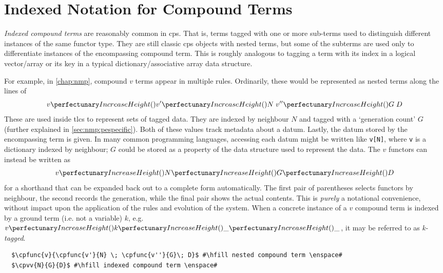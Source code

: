 \section{\label{sec:cps:compoundterms}Indexed Notation for Compound Terms}

\emph{Indexed compound terms} are reasonably common in \gls{cps}.  That is, terms tagged with one or more sub-terms used to distinguish different instances of the same \gls{functor} type.  They are still classic \gls{cps} objects with nested terms, but some of the subterms are used only to differentiate instances of the encompassing compound term.  This is roughly analogous to tagging a term with its index in a logical vector/array or its key in a typical dictionary/associative array data structure.

For example, in \cref{chap:nmp}, compound \(v\) terms appear in multiple rules.  Ordinarily, these would be represented as nested terms along the lines of
\[ \cpfunc{v}{\cpfunc{v'}{N} \; \cpfunc{v''}{G}\; D} \]
These are used inside \glspl{tlc} to represent sets of tagged data.  They are indexed by neighbour \(N\) and tagged with a `generation count' \(G\) (further explained in \cref{sec:nmp:pespecific}).  Both of these values track metadata about a datum.  Lastly, the datum stored by the encompassing term is given.  In many common programming languages, accessing each datum might be written like \texttt{v[N]}, where \texttt{v} is a dictionary indexed by neighbour;  \(G\) could be stored as a property of the data structure used to represent the data.  The \(v\) \glspl{functor} can instead be written as \[ \cpvv{N}{G}{D} \] for a shorthand that can be expanded back out to a complete form automatically.  The first pair of parentheses selects \glspl{functor} by neighbour, the second records the generation, while the final pair shows the actual contents.  This is \emph{purely} a notational convenience, without impact upon the application of the rules and evolution of the system.  When a concrete instance of a \(v\) compound term is indexed by a ground term (i.e. not a variable) \(k\), e.g. \(\cpvv{k}{\_}{\_}\), it may be referred to as \emph{k-tagged}.

\lstset{xleftmargin=.5in, xrightmargin=.5in} 
\begin{lstlisting}
  $\cpfunc{v}{\cpfunc{v'}{N} \; \cpfunc{v''}{G}\; D}$ #\hfill nested compound term \enspace#
  $\cpvv{N}{G}{D}$ #\hfill indexed compound term \enspace#
\end{lstlisting}